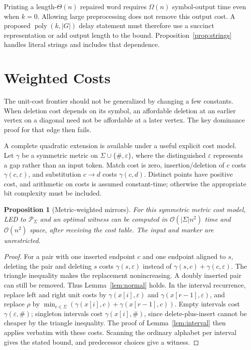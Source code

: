 \documentclass[sigconf,screen]{acmart}
\newcommand{\Pal}{\mathcal P}
\newcommand{\eps}{\varepsilon}
\newcommand{\Oh}{\mathcal O}
\newtheorem{proposition}[theorem]{Proposition}
\theoremstyle{definition}
\begin{document}
Printing a length-$\Theta(n)$ repaired word requires $\Omega(n)$ symbol-output time even when $k=0$. Allowing large preprocessing does not remove this output cost. A proposed $\operatorname{poly}(k,|G|)$ delay statement must therefore use a succinct representation or add output length to the bound. Proposition~\ref{prop:strings} handles literal strings and includes that dependence.

\section{Weighted Costs}\label{sec:weights}
The unit-cost frontier should not be generalized by changing a few constants. When deletion cost depends on its symbol, an affordable deletion at an earlier vertex on a diagonal need not be affordable at a later vertex. The key dominance proof for that edge then fails.

A complete quadratic extension is available under a useful explicit cost model. Let $\gamma$ be a symmetric metric on $\Sigma\cup\{\#,\eps\}$, where the distinguished $\eps$ represents a gap rather than an input token. Match cost is zero, insertion/deletion of $c$ costs $\gamma(c,\eps)$, and substitution $c\to d$ costs $\gamma(c,d)$. Distinct points have positive cost, and arithmetic on costs is assumed constant-time; otherwise the appropriate bit complexity must be included.

\begin{proposition}[Metric-weighted mirrors]\label{prop:weighted}
For this symmetric metric cost model, LED to $\Pal_\Sigma$ and an optimal witness can be computed in $\Oh(|\Sigma|n^2)$ time and $\Oh(n^2)$ space, after receiving the cost table. The input and marker are unrestricted.
\end{proposition}
\begin{proof}
For a pair with one inserted endpoint $c$ and one endpoint aligned to $s$, deleting the pair and deleting $s$ costs $\gamma(s,\eps)$ instead of $\gamma(s,c)+\gamma(c,\eps)$. The triangle inequality makes the replacement nonincreasing. A doubly inserted pair can still be removed. Thus Lemma~\ref{lem:normal} holds. In the interval recurrence, replace left and right unit costs by $\gamma(x[i],\eps)$ and $\gamma(x[r-1],\eps)$, and replace $\rho$ by $\min_{c\in\Sigma}(\gamma(x[i],c)+\gamma(x[r-1],c))$. Empty intervals cost $\gamma(\eps,\#)$; singleton intervals cost $\gamma(x[i],\#)$, since delete-plus-insert cannot be cheaper by the triangle inequality. The proof of Lemma~\ref{lem:interval} then applies verbatim with these costs. Scanning the ordinary alphabet per interval gives the stated bound, and predecessor choices give a witness.
\end{proof}
\end{document}
